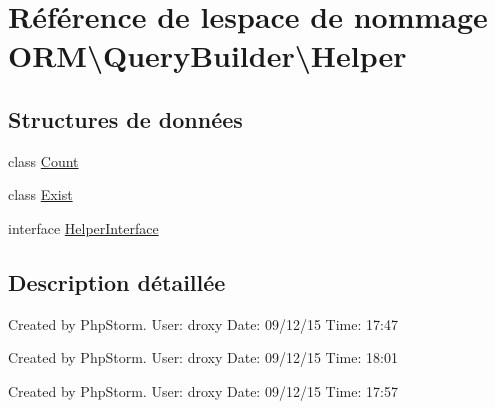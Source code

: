 \hypertarget{namespace_o_r_m_1_1_query_builder_1_1_helper}{}\section{Référence de l\textquotesingle{}espace de nommage O\+RM\textbackslash{}Query\+Builder\textbackslash{}Helper}
\label{namespace_o_r_m_1_1_query_builder_1_1_helper}
\subsection*{Structures de données}
\begin{DoxyCompactItemize}
\item 
class \hyperlink{class_o_r_m_1_1_query_builder_1_1_helper_1_1_count}{Count}
\item 
class \hyperlink{class_o_r_m_1_1_query_builder_1_1_helper_1_1_exist}{Exist}
\item 
interface \hyperlink{interface_o_r_m_1_1_query_builder_1_1_helper_1_1_helper_interface}{Helper\+Interface}
\end{DoxyCompactItemize}


\subsection{Description détaillée}
Created by Php\+Storm. User\+: droxy Date\+: 09/12/15 Time\+: 17\+:47

Created by Php\+Storm. User\+: droxy Date\+: 09/12/15 Time\+: 18\+:01

Created by Php\+Storm. User\+: droxy Date\+: 09/12/15 Time\+: 17\+:57 